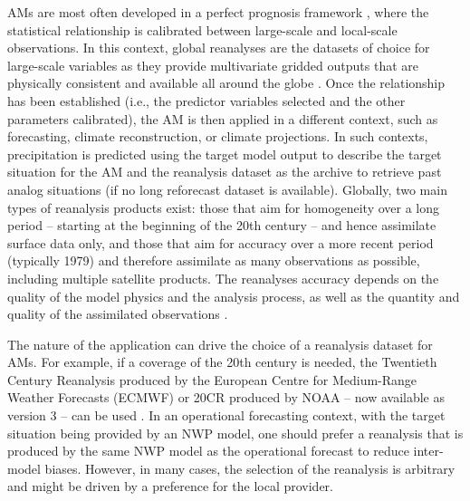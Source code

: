 \documentclass[alpha-refs]{wiley-article}
\begin{document}
AMs are most often developed in a perfect prognosis framework \citep{Rummukainen1997, Maraun2010}, where the statistical relationship is calibrated between large-scale and local-scale observations. In this context, global reanalyses are the datasets of choice for large-scale variables as they provide multivariate gridded outputs that are physically consistent and available all around the globe \citep{Gelaro2017}. Once the relationship has been established (i.e., the predictor variables selected and the other parameters calibrated), the AM is then applied in a different context, such as forecasting, climate reconstruction, or climate projections. In such contexts, precipitation is predicted using the target model output to describe the target situation for the AM and the reanalysis dataset as the archive to retrieve past analog situations (if no long reforecast dataset is available). Globally, two main types of reanalysis products exist: those that aim for homogeneity over a long period -- starting at the beginning of the 20th century -- and hence assimilate surface data only, and those that aim for accuracy over a more recent period (typically 1979) and therefore assimilate as many observations as possible, including multiple satellite products. The reanalyses accuracy depends on the quality of the model physics and the analysis process, as well as the quantity and quality of the assimilated observations \citep{Dee2011a}.

The nature of the application can drive the choice of a reanalysis dataset for AMs. For example, if a coverage of the 20th century is needed, the Twentieth Century Reanalysis produced by the European Centre for Medium-Range Weather Forecasts (ECMWF) \citep[ERA-20C or CERA-20C --][]{Poli2016, Laloyaux2016} or 20CR \citep{Compo2011} produced by NOAA -- now available as version 3 \citep{Slivinski2019, Slivinski2021} -- can be used \citep[for example,][]{Kuentz2015, Caillouet2016, Brigode2016, Bonnet2017}. In an operational forecasting context, with the target situation being provided by an NWP model, one should prefer a reanalysis that is produced by the same NWP model as the operational forecast to reduce inter-model biases. However, in many cases, the selection of the reanalysis is arbitrary and might be driven by a preference for the local provider.  
\end{document}

